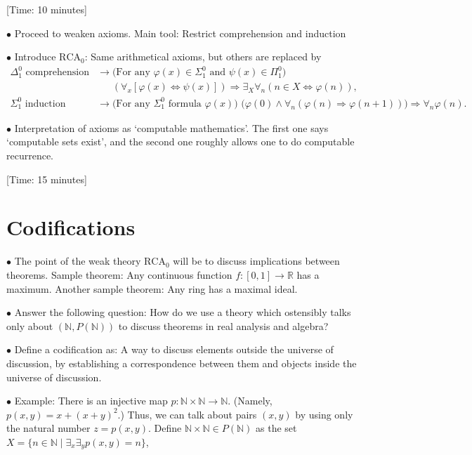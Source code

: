 \documentclass{article}
\theoremstyle{nonumberplain}
\newcommand{\N}{\mathbb{N}}
\newcommand{\R}{\mathbb{R}}
\newcommand{\RCA}{\mathrm{RCA}}
\newcommand\point[1]{\noindent \hspace{\labelsep} $\bullet$ #1 \smallskip}
\newcommand\timestamp[1]{\noindent \hspace{\labelsep} [Time: #1] \smallskip}
\begin{document}
\timestamp{10 minutes}

\point{Proceed to weaken axioms. Main tool: Restrict comprehension and induction}

\point{Introduce $\RCA_0$: Same arithmetical axioms, but others are replaced by}
\begin{equation}
\begin{aligned}
\text{$\Delta^0_1$ comprehension} &\rightarrow \text{(For any $\varphi(x) \in \Sigma^0_1$ and $\psi(x) \in \Pi^0_1$)}\\
&\mathrel{\phantom{\rightarrow}} (\forall_x [\varphi(x) \Leftrightarrow \psi(x)]) \Rightarrow \exists_X \forall_n (n \in X \Leftrightarrow \varphi(n)),\\
\text{$\Sigma^0_1$ induction} &\rightarrow \text{(For any $\Sigma^0_1$ formula $\varphi(x)$) } \big(\varphi(0) \land \forall_n (\varphi(n) \Rightarrow \varphi(n+1)) \big) \Rightarrow \forall_n \varphi(n).
\end{aligned}
\end{equation}

\point{Interpretation of axioms as `computable mathematics'. The first one says `computable sets exist', and the second one roughly allows one to do computable recurrence.}

\timestamp{15 minutes}

\section{Codifications}

\point{The point of the weak theory $\RCA_0$ will be to discuss implications between theorems. Sample theorem: Any continuous function $f \colon [0,1] \to \R$ has a maximum. Another sample theorem: Any ring has a maximal ideal.}

\point{Answer the following question: How do we use a theory which ostensibly talks only about $(\N,P(\N))$ to discuss theorems in real analysis and algebra?}

\point{Define a codification as: A way to discuss elements outside the universe of discussion, by establishing a correspondence between them and objects inside the universe of discussion.}

\point{Example: There is an injective map $p \colon \N \times \N \to \N$. (Namely, $p(x,y) = x + (x+y)^2$.) Thus, we can talk about pairs $(x,y)$ by using only the natural number $z = p(x,y)$. Define $\N \times \N \in P(\N)$ as the set $X = \{n \in \N \mid \exists_x \exists_y p(x,y) = n\}$,}
\end{document}
